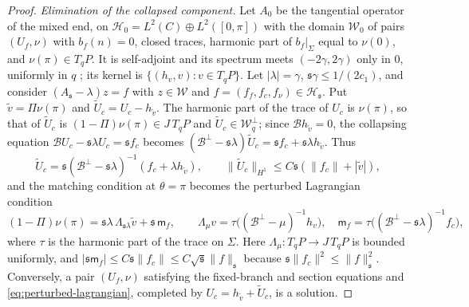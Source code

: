 \documentclass[11pt]{amsart}
\theoremstyle{definition}
\theoremstyle{remark}
\theoremstyle{plain}
\numberwithin{equation}{section}
\begin{document}
\begin{proof}
\emph{Elimination of the collapsed component.} Let $A_0$ be the tangential operator of
the mixed end, on $\mathcal H_0=L^2(C)\oplus L^2([0,\pi])$ with the domain $\mathcal W_0$
of pairs $(U_f,\nu)$ with $b_f(n)=0$, closed traces, harmonic part of $b_f|_\Sigma$ equal
to $\nu(0)$, and $\nu(\pi)\in T_qP$. It is self-adjoint and its spectrum meets
$(-2\gamma,2\gamma)$ only in $0$, uniformly in $q$ \cite[(4.20)--(4.24)]{DFL}; its kernel
is $\{(h_v,v)\colon v\in T_qP\}$. Let $|\lambda|=\gamma$, ${\mathfrak s}\gamma\le1/(2c_1)$, and
consider $(A_{\mathfrak s}-\lambda)z=f$ with $z\in\mathcal W$ and
$f=(f_f,f_c,f_\nu)\in\mathcal H_{\mathfrak s}$. Put $\tilde v=\Pi\nu(\pi)$ and $\tilde
U_c=U_c-h_{\tilde v}$. The harmonic part of the trace of $U_c$ is $\nu(\pi)$, so that of
$\tilde U_c$ is $(1-\Pi)\nu(\pi)\in J\,T_qP$ and $\tilde U_c\in\mathcal W^\perp_q$; since
$\mathcal Bh_{\tilde v}=0$, the collapsing equation $\mathcal BU_c-{\mathfrak s}\lambda U_c={\mathfrak s} f_c$
becomes $(\mathcal B^\perp-{\mathfrak s}\lambda)\tilde U_c={\mathfrak s} f_c+{\mathfrak s}\lambda h_{\tilde v}$. Thus
\[
\tilde U_c={\mathfrak s}(\mathcal B^\perp-{\mathfrak s}\lambda)^{-1}(f_c+\lambda h_{\tilde v}),\qquad
\|\tilde U_c\|_{H^1}\le C{\mathfrak s}(\|f_c\|+|\tilde v|),
\]
and the matching condition at $\theta=\pi$ becomes the perturbed Lagrangian condition
\begin{equation}\label{eq:perturbed-lagrangian}
(1-\Pi)\nu(\pi)={\mathfrak s}\lambda\,\Lambda_{{\mathfrak s}\lambda}\tilde v+{\mathfrak s}\,\mathsf m_f,\qquad
\Lambda_\mu v=\tau\bigl((\mathcal B^\perp-\mu)^{-1}h_v\bigr),\quad
\mathsf m_f=\tau\bigl((\mathcal B^\perp-{\mathfrak s}\lambda)^{-1}f_c\bigr),
\end{equation}
where $\tau$ is the harmonic part of the trace on $\Sigma$. Here $\Lambda_\mu\colon
T_qP\to J\,T_qP$ is bounded uniformly, and $|{\mathfrak s}\mathsf m_f|\le C{\mathfrak s}\|f_c\|\le
C\sqrt{\mathfrak s}\|f\|_{\mathfrak s}$ because ${\mathfrak s}\|f_c\|^2\le\|f\|_{\mathfrak s}^2$. Conversely, a pair
$(U_f,\nu)$ satisfying the fixed-branch and section equations and
\eqref{eq:perturbed-lagrangian}, completed by $U_c=h_{\tilde v}+\tilde U_c$, is a solution.


\end{proof}
\end{document}
